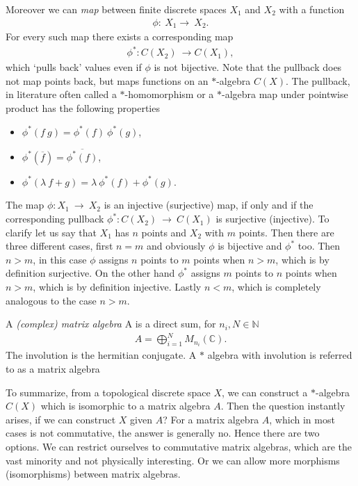 Moreover we can \textit{map} between finite discrete spaces $X_1$ and $X_2$ with a
function
\begin{align}
    \phi:\ X_1 \rightarrow\ X_2.
\end{align}
For every such map there exists a corresponding map
\begin{align}
    \phi ^*:C(X_2)\ \rightarrow C(X_1),
\end{align}
which `pulls back' values even if $\phi$ is not bijective.
Note that the pullback does not map points back, but maps functions on an $*$-algebra $C(X)$.
The pullback, in literature often called a $*$-homomorphism or a $*$-algebra map under
pointwise product has the following properties
\begin{itemize}
    \item $\phi ^*(f\ g) = \phi ^*(f)\ \phi ^*(g)$,
    \item $\phi ^*(\overline{f}) = \overline{\phi ^*(f)}$,
    \item $\phi ^*(\lambda\ f + g) = \lambda\ \phi ^*(f) + \phi ^*(g)$.
\end{itemize}
    The map $\phi :X_1\ \rightarrow \ X_2$ is an injective (surjective) map,
    if only and if the corresponding pullback $\phi ^* :C(X_2)\ \rightarrow \
    C(X_1)$ is surjective (injective). To clarify let us say that $X_1$ has $n$ points and
    $X_2$ with $m$ points. Then there are three different cases, first $n=m$ and
    obviously $\phi$ is bijective and $\phi ^*$ too. Then $n >  m$, in this case
    $\phi$ assigns $n$ points to $m$ points when $n >  m$, which is by definition
    surjective. On the other hand $\phi ^*$ assigns $m$ points to $n$ points when
    $n >  m$, which is by definition injective. Lastly $n < m $, which is
    completely analogous to the case $n > m$.

\begin{mydefinition}
    A \textit{(complex) matrix algebra} A is a direct sum, for $n_i, N \in
    \mathbb{N}$
    \begin{align}
        A = \bigoplus _{i=1}^{N} M_{n_i}(\mathbb{C}).
    \end{align}
    The involution is the hermitian conjugate. A $*$ algebra with involution is referred to as
    a matrix algebra
\end{mydefinition}

To summarize, from a topological discrete space $X$, we can construct a
$*$-algebra $C(X)$ which is isomorphic to a matrix algebra $A$. Then the
question instantly arises, if we can construct $X$ given $A$? For a matrix
algebra $A$, which in most cases is not commutative, the answer is generally
no. Hence there are two options. We can restrict ourselves to commutative
matrix algebras, which are the vast minority and not physically interesting.
Or we can allow more morphisms (isomorphisms) between matrix algebras.

